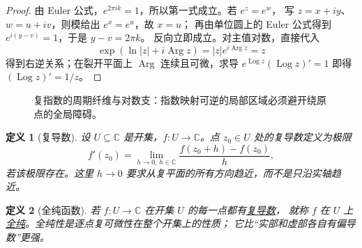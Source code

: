 \documentclass[UTF8,fontset=none,a4paper,11pt]{ctexart}
\theoremstyle{foundation-definition}
\newtheorem{definition}{定义}[section]
\theoremstyle{foundation-theorem}
\theoremstyle{foundation-proposition}
\theoremstyle{foundation-example}
\theoremstyle{foundation-remark}
\theoremstyle{foundation-theorem}
\newcommand{\C}{\mathbb C}
\newcommand{\term}[2]{\hyperref[#1]{#2}}
\begin{document}
\begin{proof}
由 Euler 公式，\(e^{2\pi i k}=1\)，所以第一式成立。若 \(e^z=e^w\)，
写 \(z=x+iy\)、\(w=u+iv\)，则模给出 \(e^x=e^u\)，故 \(x=u\)；
再由单位圆上的 Euler 公式得到 \(e^{i(y-v)}=1\)，于是 \(y-v=2\pi k\)。
反向立即成立。对主值对数，直接代入
\[
\exp(\ln|z|+i\operatorname{Arg} z)=|z|e^{i\operatorname{Arg} z}=z
\]
得到右逆关系；在裂开平面上 \(\operatorname{Arg}\) 连续且可微，求导
\(e^{\operatorname{Log} z}(\operatorname{Log} z)'=1\) 即得 \((\operatorname{Log} z)'=1/z\)。
\end{proof}

\begin{figure}[htbp]
\centering
{}
\caption{复指数的周期纤维与对数支：指数映射可逆的局部区域必须避开绕原点的全局障碍。}
\label{fig:complex-exponential-periodicity}
\end{figure}

\begin{definition}[复导数]\label{def:complex-derivative}
设 \(U\subseteq\C\) 是开集，\(f:U\to\C\)。点 \(z_0\in U\) 处的复导数定义为极限
\[
f'(z_0)=\lim_{h\to0,\,h\in\C}
\frac{f(z_0+h)-f(z_0)}{h},
\]
若该极限存在。这里 \(h\to0\) 要求从复平面的所有方向趋近，而不是只沿实轴趋近。
\end{definition}

\begin{definition}[全纯函数]\label{def:holomorphic}
若 \(f:U\to\C\) 在开集 \(U\) 的每一点都有\term{def:complex-derivative}{复导数}，
就称 \(f\) 在 \(U\) 上\term{def:holomorphic}{全纯}。全纯性是逐点复可微性在整个开集上的性质；
它比“实部和虚部各自有偏导数”更强。
\end{definition}
\end{document}
